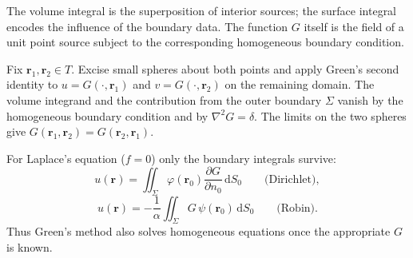 \begin{definition}
The volume integral is the superposition of interior sources; the surface integral encodes the influence of the boundary data. The function $G$ itself is the field of a unit point source subject to the corresponding homogeneous boundary condition.
\end{definition}

\begin{note}
Fix $\mathbf{r}_1,\mathbf{r}_2\in T$. Excise small spheres about both points and apply Green's second identity to $u=G(\cdot,\mathbf{r}_1)$ and $v=G(\cdot,\mathbf{r}_2)$ on the remaining domain. The volume integrand and the contribution from the outer boundary $\Sigma$ vanish by the homogeneous boundary condition and by $\nabla^2 G=\delta$. The limits on the two spheres give $G(\mathbf{r}_1,\mathbf{r}_2)=G(\mathbf{r}_2,\mathbf{r}_1)$.
\end{note}

For Laplace's equation ($f=0$) only the boundary integrals survive:
\begin{equation}
u(\mathbf{r})=\iint_{\Sigma}\varphi(\mathbf{r}_0)\frac{\partial G}{\partial n_0}\,\mathrm{d}S_0
\qquad\text{(Dirichlet)},
\end{equation}
\begin{equation}
u(\mathbf{r})=-\frac{1}{\alpha}\iint_{\Sigma}G\,\psi(\mathbf{r}_0)\,\mathrm{d}S_0
\qquad\text{(Robin)}.
\end{equation}
Thus Green's method also solves homogeneous equations once the appropriate $G$ is known.
